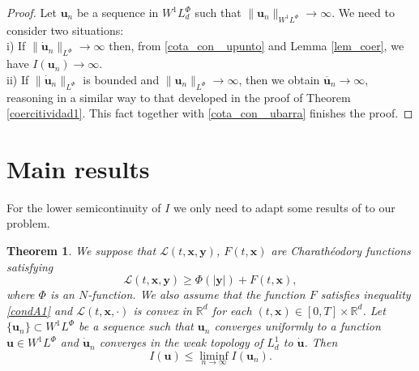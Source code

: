 \documentclass[twoside]{article}
\newtheorem{thm}{Theorem}[section]
\theoremstyle{remark}
\newcommand{\orlnor}{\|_{L^{\Phi}}}
\newcommand{\lphi}{L^{\Phi}}
\newcommand{\wphi}{W^{1}\lphi}
\newcommand{\sobnor}{\|_{W^{1}\lphi}}
\renewcommand{\b}[1]{\boldsymbol{#1}}
\newcommand{\rr}{\mathbb{R}}
\renewcommand{\leq}{\leqslant}
\begin{document}
\begin{proof}
Let $\b{u}_n$ be a sequence in $\wphi_d$ such that $\|\b{u}_n\sobnor\to\infty$. We need to consider two situations:
\\
i) If $\|\b{\dot {u}}_n\orlnor\to\infty$ then, 
from  \eqref{cota_con _upunto} and Lemma \ref{lem_coer}, we have $I(\b{u}_n)\to\infty$. 
\\
ii) If $\|\b{\dot{u}}_n\orlnor$ is bounded and $\|\b{u}_n\orlnor\to\infty$,  then we obtain $\b{\overline{u}}_n \to\infty$,
reasoning in a similar way to that developed in the proof of Theorem \ref{coercitividad1}. 
This fact together with  \eqref{cota_con _ubarra} finishes the proof. 
\end{proof}



\section{Main results}




For the lower semicontinuity of  $I$ we only need to adapt some results of \cite{ekeland1999convex} to our problem. 


\begin{thm}\label{semicontinf}
We suppose that $\mathcal{L}(t,\b{x},\b{y})$, $F(t,\b{x})$ are Charath\'eodory functions satisfying
\begin{equation}\label{cota_inf_2}
\mathcal{L}(t,\b{x},\b{y})\geq \Phi\left(|\b{y}|\right)+ F(t,\b{x}),
\end{equation}
where $\Phi$ is an $N$-function. 
We also assume that the function $F$ satisfies inequality \eqref{condA1} and $\mathcal{L}(t,\b{x},\cdot)$ is convex in $\rr^d$ for each $(t,\b{x})\in [0,T]\times\rr^d$.  Let $\{\b{u}_n\}\subset\wphi$ be a sequence such that $\b{u}_n$ converges  uniformly  to a function $\b{u}\in\wphi$ and $\b{\dot{u}}_n$ converges in the weak topology of $L^1_d$ to $\b{\dot{u}}$.   Then
\begin{equation}\label{liminf0}I(\b{u})\leq \liminf_{n\to\infty}I(\b{u}_n).
\end{equation}

\end{thm}
\end{document}
